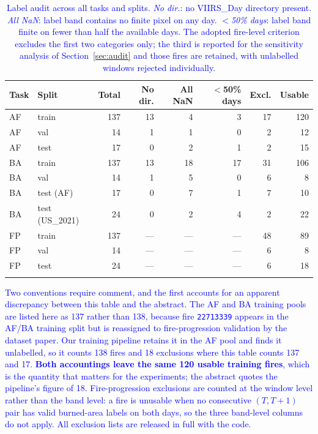 \documentclass[sensors,article,submit,moreauthors,pdftex]{Definitions/mdpi}
\newcommand{\rev}[1]{\textcolor{blue}{#1}}
\begin{document}
\begin{table}[H]
\centering
\caption{\rev{Label audit across all tasks and splits. \emph{No dir.}: no
VIIRS\_Day directory present. \emph{All NaN}: label band contains no finite pixel
on any day. \emph{$<$50\% days}: label band finite on fewer than half the
available days. The adopted fire-level criterion excludes the first two
categories only; the third is reported for the sensitivity analysis of
Section~\ref{sec:audit} and those fires are retained, with unlabelled windows
rejected individually.}}
\label{tab:audit_all}
\renewcommand{\arraystretch}{1.15}
\begin{tabular}{@{}llrrrrrr@{}}
\arrayrulecolor{hdrblue}
\toprule
\rowcolor{hdrblue}
\color{white}\textbf{Task} &
\color{white}\textbf{Split} &
\color{white}\textbf{Total} &
\color{white}\textbf{No dir.} &
\color{white}\textbf{All NaN} &
\color{white}\textbf{$<$50\% days} &
\color{white}\textbf{Excl.} &
\color{white}\textbf{Usable} \\
\midrule
\rowcolor{rowA} AF & train      & 137 & 13 & 4  & 3 & 17 & 120 \\
\rowcolor{white} AF & val        & 14  & 1  & 1  & 0 & 2  & 12  \\
\rowcolor{rowA} AF & test        & 17  & 0  & 2  & 1 & 2  & 15  \\
\midrule
\rowcolor{white} BA & train      & 137 & 13 & 18 & 17 & 31 & 106 \\
\rowcolor{rowA} BA & val         & 14  & 1  & 5  & 0  & 6  & 8   \\
\rowcolor{white} BA & test (AF)   & 17  & 0  & 7  & 1  & 7  & 10  \\
\rowcolor{rowA} BA & test (US\_2021) & 24 & 0 & 2 & 4 & 2 & 22 \\
\midrule
\rowcolor{white} FP & train      & 137 & --- & --- & --- & 48 & 89 \\
\rowcolor{rowA} FP & val         & 14  & --- & --- & --- & 6  & 8  \\
\rowcolor{white} FP & test        & 24  & --- & --- & --- & 6  & 18 \\
\arrayrulecolor{hdrblue}\bottomrule
\end{tabular}
\end{table}

\rev{Two conventions require comment, and the first accounts for an apparent
discrepancy between this table and the abstract. The AF and BA training pools are
listed here as 137 rather than 138, because fire \texttt{22713339} appears in the
AF/BA training split but is reassigned to fire-progression validation by the
dataset paper. Our training pipeline retains it in the AF pool and finds it
unlabelled, so it counts 138 fires and 18 exclusions where this table counts 137
and 17. \textbf{Both accountings leave the same 120 usable training fires}, which
is the quantity that matters for the experiments; the abstract quotes the
pipeline's figure of 18. Fire-progression exclusions are counted at the window
level rather than the band level: a fire is unusable when no consecutive
$(T, T{+}1)$ pair has valid burned-area labels on both days, so the three
band-level columns do not apply. All exclusion lists are released in full with
the code.}
\end{document}
